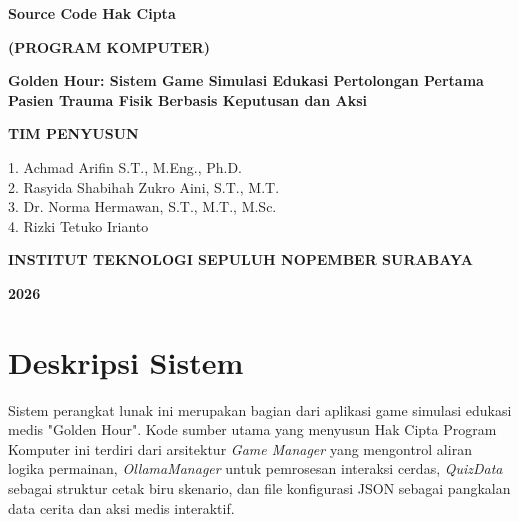 \documentclass[12pt,a4paper]{article}
\begin{document}
\begin{titlepage}
    \centering
    \vspace*{2cm}
    
    {\Large \textbf{Source Code Hak Cipta}\par}
    \vspace{0.5cm}
    {\large \textbf{(PROGRAM KOMPUTER)}\par}
    
    \vspace{2.5cm}
    
    {\Large \textbf{Golden Hour: Sistem Game Simulasi Edukasi Pertolongan Pertama Pasien Trauma Fisik Berbasis Keputusan dan Aksi}\par}
    
    \vspace{3cm}
    
    {\large \textbf{TIM PENYUSUN}\par}
    \vspace{0.5cm}
    \begin{center}
    1. Achmad Arifin S.T., M.Eng., Ph.D. \\
    2. Rasyida Shabihah Zukro Aini, S.T., M.T. \\
    3. Dr. Norma Hermawan, S.T., M.T., M.Sc. \\
    4. Rizki Tetuko Irianto \\
    \end{center}
    
    \vfill
    
    {\large \textbf{INSTITUT TEKNOLOGI SEPULUH NOPEMBER SURABAYA}\par}
    {\large \textbf{2026}\par}
    
    \vspace*{1cm}
\end{titlepage}

\newpage
\tableofcontents
\newpage

\section{Deskripsi Sistem}
Sistem perangkat lunak ini merupakan bagian dari aplikasi game simulasi edukasi medis "Golden Hour". Kode sumber utama yang menyusun Hak Cipta Program Komputer ini terdiri dari arsitektur \textit{Game Manager} yang mengontrol aliran logika permainan, \textit{OllamaManager} untuk pemrosesan interaksi cerdas, \textit{QuizData} sebagai struktur cetak biru skenario, dan file konfigurasi JSON sebagai pangkalan data cerita dan aksi medis interaktif.
\end{document}
